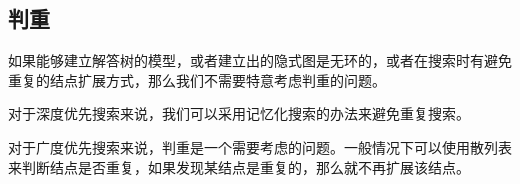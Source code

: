 \subsection{判重}
	如果能够建立解答树的模型，或者建立出的隐式图是无环的，或者在搜索时有避免重复的结点扩展方式，那么我们不需要特意考虑判重的问题。
	
	对于深度优先搜索来说，我们可以采用记忆化搜索的办法来避免重复搜索。
	
	对于广度优先搜索来说，判重是一个需要考虑的问题。一般情况下可以使用散列表来判断结点是否重复，如果发现某结点是重复的，那么就不再扩展该结点。